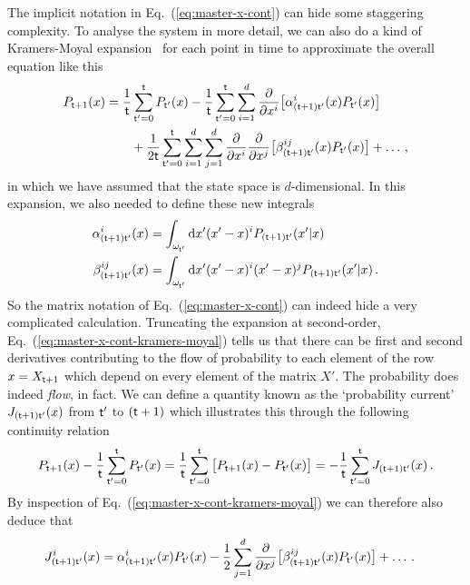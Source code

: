 \documentclass{book}
\begin{document}
The implicit notation in Eq.~(\ref{eq:master-x-cont}) can hide some staggering complexity. To analyse the system in more detail, we can also do a kind of Kramers-Moyal expansion~\cite{kramers1940brownian,moyal1949stochastic} for each point in time to approximate the overall equation like this
\begin{align}
P_{{\sf t}+1}(x) &= \frac{1}{{\sf t}}\sum_{{\sf t}'=0}^{{\sf t}}P_{{\sf t}'}(x) - \frac{1}{{\sf t}}\sum_{{\sf t}'=0}^{{\sf t}}\sum_{i=1}^d\frac{\partial}{\partial x^i}\big[ \alpha^i_{({\sf t}+1){\sf t}'}(x)P_{{\sf t}'}(x)\big] \nonumber \\
& \qquad + \frac{1}{2{\sf t}}\sum_{{\sf t}'=0}^{{\sf t}}\sum_{i=1}^d\sum_{j=1}^d\frac{\partial}{\partial x^i}\frac{\partial}{\partial x^j}\big[ \beta^{ij}_{({\sf t}+1){\sf t}'}(x)P_{{\sf t}'}(x)\big] + \dots \label{eq:master-x-cont-kramers-moyal} \,,
\end{align}
in which we have assumed that the state space is $d$-dimensional. In this expansion, we also needed to define these new integrals
\begin{align}
\alpha^i_{({\sf t}+1){\sf t}'}(x) &=\int_{\omega_{{\sf t}'}} {\rm d}x'(x'-x)^iP_{({\sf t}+1){\sf t}'}(x'\vert x) \\
\beta^{ij}_{({\sf t}+1){\sf t}'}(x) &= \int_{\omega_{{\sf t}'}} {\rm d}x'(x'-x)^i(x'-x)^jP_{({\sf t}+1){\sf t}'}(x'\vert x) \,.
\end{align}
So the matrix notation of Eq.~(\ref{eq:master-x-cont}) can indeed hide a very complicated calculation. Truncating the expansion at second-order, Eq.~(\ref{eq:master-x-cont-kramers-moyal}) tells us that there can be first and second derivatives contributing to the flow of probability to each element of the row $x=X_{{\sf t}+1}$ which depend on every element of the matrix $X'$. The probability does indeed \emph{flow}, in fact. We can define a quantity known as the `probability current' $J_{({\sf t}+1){\sf t}'}(x)$ from ${\sf t}'$ to $({\sf t}+1)$ which illustrates this through the following continuity relation
\begin{align}
P_{{\sf t}+1}(x) - \frac{1}{{\sf t}}\sum_{{\sf t}'=0}^{{\sf t}}P_{{\sf t}'}(x) = \frac{1}{{\sf t}}\sum_{{\sf t}'=0}^{{\sf t}}\big[ P_{{\sf t}+1}(x) - P_{{\sf t}'}(x)\big] = - \frac{1}{{\sf t}}\sum_{{\sf t}'=0}^{{\sf t}}J_{({\sf t}+1){\sf t}'}(x) \,.
\end{align}
By inspection of Eq.~(\ref{eq:master-x-cont-kramers-moyal}) we can therefore also deduce that
\begin{align}
J^i_{({\sf t}+1){\sf t}'}(x) &= \alpha^i_{({\sf t}+1){\sf t}'}(x)P_{{\sf t}'}(x) - \frac{1}{2}\sum_{j=1}^d\frac{\partial}{\partial x^j}\big[ \beta^{ij}_{({\sf t}+1){\sf t}'}(x)P_{{\sf t}'}(x)\big] + \dots \,.
\end{align}
\end{document}
